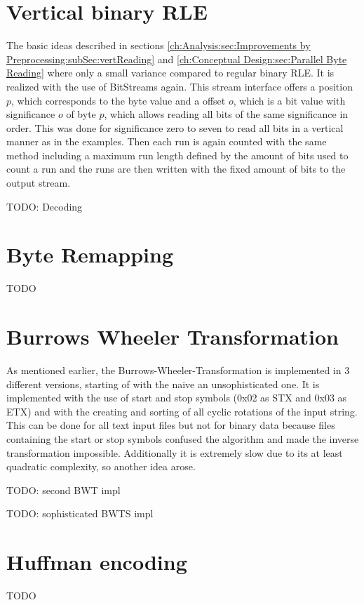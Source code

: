\section{Vertical binary RLE}
\par{
	The basic ideas described in sections \ref{ch:Analysis:sec:Improvements by Preprocessing:subSec:vertReading} and \ref{ch:Conceptual Design:sec:Parallel Byte Reading} where only a small variance compared to regular binary RLE. It is realized with the use of BitStreams again. This stream interface offers a position $p$, which corresponds to the byte value and a offset $o$, which is a bit value with significance $o$ of byte $p$, which allows reading all bits of the same significance in order. This was done for significance zero to seven to read all bits in a vertical manner as in the examples. Then each run is again counted with the same method including a maximum run length defined by the amount of bits used to count a run and the runs are then written with the fixed amount of bits to the output stream.
}
\par{
	TODO: Decoding
}
\section{Byte Remapping}
\par{
	TODO
}
\section{Burrows Wheeler Transformation}
\par{
	As mentioned earlier, the Burrows-Wheeler-Transformation is implemented in 3 different versions, starting of with the naive an unsophisticated one. It is implemented with the use of start and stop symbols (0x02 as STX and 0x03 as ETX) and with the creating and sorting of all cyclic rotations of the input string. This can be done for all text input files but not for binary data because files containing the start or stop symbols confused the algorithm and made the inverse transformation impossible. Additionally it is extremely slow due to its at least quadratic complexity, so another idea arose.
}
\par{
	TODO: second BWT impl
}

\par{
	TODO: sophisticated BWTS impl
}
\section{Huffman encoding}
\par{
TODO
}
